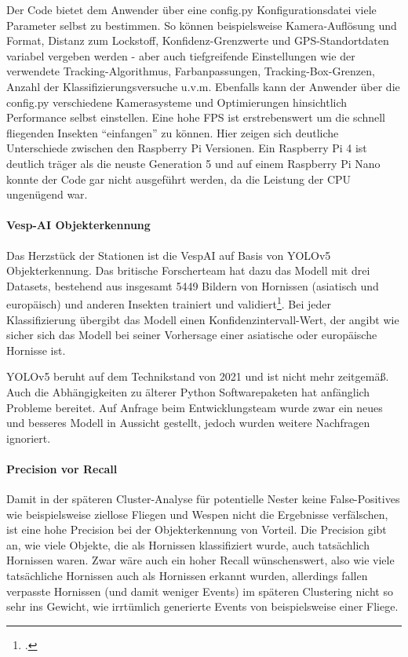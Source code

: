 Der Code bietet dem Anwender über eine config.py Konfigurationsdatei viele Parameter selbst zu bestimmen.
So können beispielsweise Kamera-Auflösung und Format, Distanz zum Lockstoff, Konfidenz-Grenzwerte und GPS-Standortdaten variabel vergeben werden - aber auch tiefgreifende Einstellungen wie der verwendete Tracking-Algorithmus, Farbanpassungen, Tracking-Box-Grenzen, Anzahl der Klassifizierungsversuche u.v.m.
Ebenfalls kann der Anwender über die config.py verschiedene Kamerasysteme und Optimierungen hinsichtlich Performance selbst einstellen. Eine hohe \ac{FPS} ist erstrebenswert um die schnell fliegenden Insekten \enquote{einfangen} zu können. Hier zeigen sich deutliche Unterschiede zwischen den Raspberry Pi Versionen. Ein Raspberry Pi 4 ist deutlich träger als die neuste Generation 5 und auf einem Raspberry Pi Nano konnte der Code gar nicht ausgeführt werden, da die Leistung der CPU ungenügend war.

\paragraph{Vesp-AI Objekterkennung}
Das Herzstück der Stationen ist die VespAI auf Basis von \ac{YOLO}v5 Objekterkennung. Das britische Forscherteam hat dazu das Modell mit drei Datasets, bestehend aus insgesamt 5449 Bildern von Hornissen (asiatisch und europäisch) und anderen Insekten trainiert und validiert\footcite[Vgl.][S. 2]{vespai}. Bei jeder Klassifizierung übergibt das Modell einen Konfidenzintervall-Wert, der angibt wie sicher sich das Modell bei seiner Vorhersage einer asiatische oder europäische Hornisse ist.

\ac{YOLO}v5 beruht auf dem Technikstand von 2021 und ist nicht mehr zeitgemäß. Auch die Abhängigkeiten zu älterer Python Softwarepaketen hat anfänglich Probleme bereitet. Auf Anfrage beim Entwicklungsteam wurde zwar ein neues und besseres Modell in Aussicht gestellt, jedoch wurden weitere Nachfragen ignoriert.

\paragraph{Precision vor Recall}
Damit in der späteren Cluster-Analyse für potentielle Nester keine False-Positives wie beispielsweise ziellose Fliegen und Wespen nicht die Ergebnisse verfälschen, ist eine hohe Precision bei der Objekterkennung von Vorteil. Die Precision gibt an, wie viele Objekte, die als Hornissen klassifiziert wurde, auch tatsächlich Hornissen waren. Zwar wäre auch ein hoher Recall wünschenswert, also wie viele tatsächliche Hornissen auch als Hornissen erkannt wurden, allerdings fallen verpasste Hornissen (und damit weniger Events) im späteren Clustering nicht so sehr ins Gewicht, wie irrtümlich generierte Events von beispielsweise einer Fliege.

